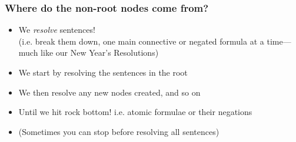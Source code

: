 \begin{frame}
\frametitle{Where do the non-root nodes come from?}

\begin{itemize}[<+->]


\item We \emph{resolve} sentences!  \\ (i.e. break them down, one main connective or negated formula at a time---much like our New Year's Resolutions)

\item We start by resolving the sentences in the root 

\item We then resolve any new nodes created, and so on 

\item Until we hit rock bottom! i.e. atomic formulae or their negations %

\item (Sometimes you can stop before resolving all sentences)


\end{itemize}
\end{frame}

